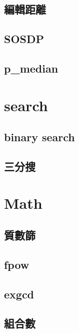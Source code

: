\documentclass[a4paper,10pt,twocolumn,oneside]{article}
\begin{document}
    \subsection{編輯距離}
    

    \subsection{SOSDP}
    

    \subsection{p\_median}
    

\section{search}
    \subsection{binary search}
    
    
    \subsection{三分搜}
    

\section{Math}
    \subsection{質數篩}
    

    \subsection{fpow}
    

    \subsection{exgcd}
    

    \subsection{組合數}
    
\end{document}
